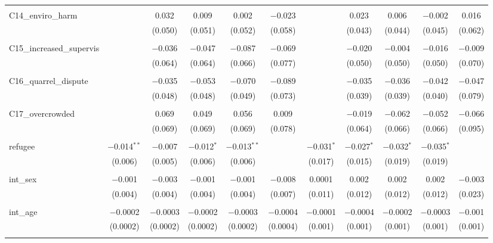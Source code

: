 \begin{table}[H]
\begin{tabular}{@{\extracolsep{4pt}}lcccccccccc}
  & & & & & & & & & & \\ 
 C14\_enviro\_harm &  & 0.032 & 0.009 & 0.002 & $-$0.023 &  & 0.023 & 0.006 & $-$0.002 & 0.016 \\ 
  &  & (0.050) & (0.051) & (0.052) & (0.058) &  & (0.043) & (0.044) & (0.045) & (0.062) \\ 
  & & & & & & & & & & \\ 
 C15\_increased\_supervis &  & $-$0.036 & $-$0.047 & $-$0.087 & $-$0.069 &  & $-$0.020 & $-$0.004 & $-$0.016 & $-$0.009 \\ 
  &  & (0.064) & (0.064) & (0.066) & (0.077) &  & (0.050) & (0.050) & (0.050) & (0.070) \\ 
  & & & & & & & & & & \\ 
 C16\_quarrel\_dispute &  & $-$0.035 & $-$0.053 & $-$0.070 & $-$0.089 &  & $-$0.035 & $-$0.036 & $-$0.042 & $-$0.047 \\ 
  &  & (0.048) & (0.048) & (0.049) & (0.073) &  & (0.039) & (0.039) & (0.040) & (0.079) \\ 
  & & & & & & & & & & \\ 
 C17\_overcrowded &  & 0.069 & 0.049 & 0.056 & 0.009 &  & $-$0.019 & $-$0.062 & $-$0.052 & $-$0.066 \\ 
  &  & (0.069) & (0.069) & (0.069) & (0.078) &  & (0.064) & (0.066) & (0.066) & (0.095) \\ 
  & & & & & & & & & & \\ 
 refugee & $-$0.014$^{**}$ & $-$0.007 & $-$0.012$^{*}$ & $-$0.013$^{**}$ &  & $-$0.031$^{*}$ & $-$0.027$^{*}$ & $-$0.032$^{*}$ & $-$0.035$^{*}$ &  \\ 
  & (0.006) & (0.005) & (0.006) & (0.006) &  & (0.017) & (0.015) & (0.019) & (0.019) &  \\ 
  & & & & & & & & & & \\ 
 int\_sex & $-$0.001 & $-$0.003 & $-$0.001 & $-$0.001 & $-$0.008 & 0.0001 & 0.002 & 0.002 & 0.002 & $-$0.003 \\ 
  & (0.004) & (0.004) & (0.004) & (0.004) & (0.007) & (0.011) & (0.012) & (0.012) & (0.012) & (0.023) \\ 
  & & & & & & & & & & \\ 
 int\_age & $-$0.0002 & $-$0.0003 & $-$0.0002 & $-$0.0003 & $-$0.0004 & $-$0.0001 & $-$0.0004 & $-$0.0002 & $-$0.0003 & $-$0.001 \\ 
  & (0.0002) & (0.0002) & (0.0002) & (0.0002) & (0.0004) & (0.001) & (0.001) & (0.001) & (0.001) & (0.001) \\ 
  & & & & & & & & & & \\ 

\end{tabular}
\end{table}
